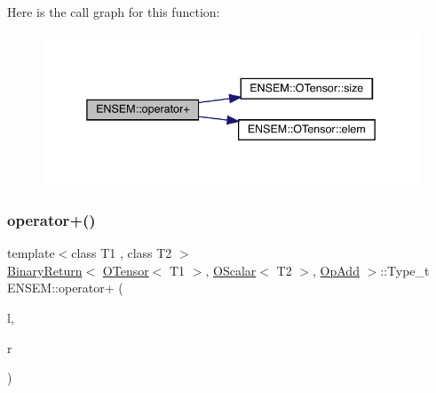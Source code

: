 Here is the call graph for this function\+:\nopagebreak
\begin{figure}[H]
\begin{center}
\leavevmode
\includegraphics[width=338pt]{de/d87/group__obstensor_gad61499ec3fe572c419aa5143ef37d965_cgraph}
\end{center}
\end{figure}
\mbox{\label{group__obstensor_gad2c9b97ae39bad4adefe3d2f480c0eb6}} 
\subsubsection{\texorpdfstring{operator+()}{operator+()}\hspace{0.1cm}{\footnotesize\ttfamily [3/4]}}
{\footnotesize\ttfamily template$<$class T1 , class T2 $>$ \\
\mbox{\hyperlink{structENSEM_1_1BinaryReturn}{Binary\+Return}}$<$ \mbox{\hyperlink{classENSEM_1_1OTensor}{O\+Tensor}}$<$ T1 $>$, \mbox{\hyperlink{classENSEM_1_1OScalar}{O\+Scalar}}$<$ T2 $>$, \mbox{\hyperlink{structENSEM_1_1OpAdd}{Op\+Add}} $>$\+::Type\+\_\+t E\+N\+S\+E\+M\+::operator+ (\begin{DoxyParamCaption}\item[{const \mbox{\hyperlink{classENSEM_1_1OTensor}{O\+Tensor}}$<$ T1 $>$ \&}]{l,  }\item[{const \mbox{\hyperlink{classENSEM_1_1OScalar}{O\+Scalar}}$<$ T2 $>$ \&}]{r }\end{DoxyParamCaption})\hspace{0.3cm}{\ttfamily [inline]}}

